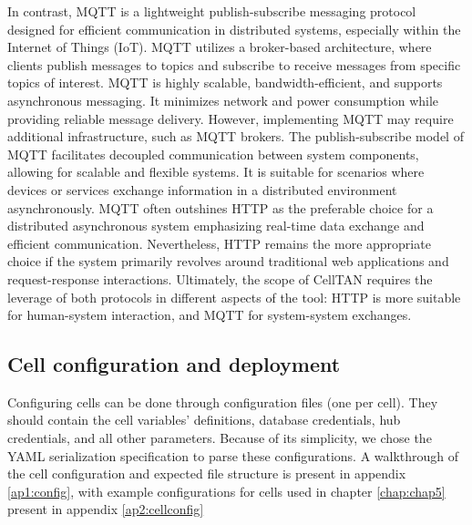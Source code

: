 In contrast, MQTT is a lightweight publish-subscribe messaging protocol designed for efficient communication in distributed systems, especially within the Internet of Things (IoT). MQTT utilizes a broker-based architecture, where clients publish messages to topics and subscribe to receive messages from specific topics of interest. MQTT is highly scalable, bandwidth-efficient, and supports asynchronous messaging. It minimizes network and power consumption while providing reliable message delivery. However, implementing MQTT may require additional infrastructure, such as MQTT brokers.
The publish-subscribe model of MQTT facilitates decoupled communication between system components, allowing for scalable and flexible systems. It is suitable for scenarios where devices or services exchange information in a distributed environment asynchronously. MQTT often outshines HTTP as the preferable choice for a distributed asynchronous system emphasizing real-time data exchange and efficient communication. Nevertheless, HTTP remains the more appropriate choice if the system primarily revolves around traditional web applications and request-response interactions. Ultimately, the scope of CellTAN requires the leverage of both protocols in different aspects of the tool: HTTP is more suitable for human-system interaction, and MQTT for system-system exchanges.


\subsection{Cell configuration and deployment} \label{subsec:cellconfig}

Configuring cells can be done through configuration files (one per cell). They should contain the cell variables' definitions, database credentials, hub credentials, and all other parameters. Because of its simplicity, we chose the YAML serialization specification \cite{yaml} to parse these configurations. A walkthrough of the cell configuration and expected file structure is present in appendix \ref{ap1:config}, with example configurations for cells used in chapter \ref{chap:chap5} present in appendix \ref{ap2:cellconfig}


